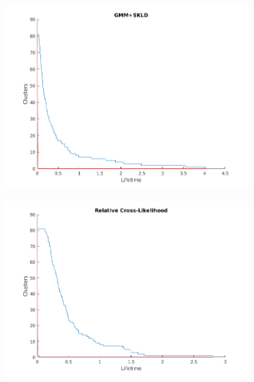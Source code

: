 \documentclass[pdftex,11pt,a4paper]{article}
\theoremstyle{definition}
\theoremstyle{remark}
\begin{document}
\begin{figure}[!t]
\centering
\begin{subfigure}{.5\textwidth}
  \centering
  \includegraphics[width=\linewidth]{images/lifetime_gmm_skld}
  \label{fig:sub1}
\end{subfigure}%
\begin{subfigure}{.5\textwidth}
  \centering
  \includegraphics[width=\linewidth]{images/random_rcl}
  \label{fig:sub2}
\end{subfigure}

\end{figure}
\end{document}
